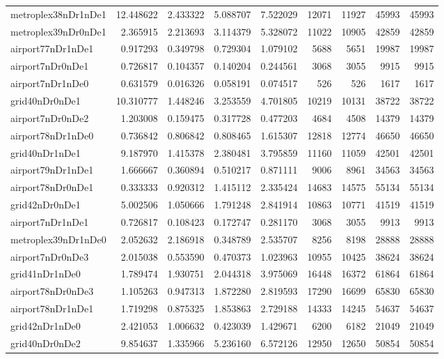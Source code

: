 \begin{longtable}{|l|r|r|r|r|r|r|r|r|}
metroplex38nDr1nDe1 & 12.448622 & 2.433322 & 5.088707 & 7.522029 & 12071 & 11927 & 45993 & 45993 \\
metroplex39nDr0nDe1 & 2.365915 & 2.213693 & 3.114379 & 5.328072 & 11022 & 10905 & 42859 & 42859 \\
airport77nDr1nDe1 & 0.917293 & 0.349798 & 0.729304 & 1.079102 & 5688 & 5651 & 19987 & 19987 \\
airport7nDr0nDe1 & 0.726817 & 0.104357 & 0.140204 & 0.244561 & 3068 & 3055 & 9915 & 9915 \\
airport7nDr1nDe0 & 0.631579 & 0.016326 & 0.058191 & 0.074517 & 526 & 526 & 1617 & 1617 \\
grid40nDr0nDe1 & 10.310777 & 1.448246 & 3.253559 & 4.701805 & 10219 & 10131 & 38722 & 38722 \\
airport7nDr0nDe2 & 1.203008 & 0.159475 & 0.317728 & 0.477203 & 4684 & 4508 & 14379 & 14379 \\
airport78nDr1nDe0 & 0.736842 & 0.806842 & 0.808465 & 1.615307 & 12818 & 12774 & 46650 & 46650 \\
grid40nDr1nDe1 & 9.187970 & 1.415378 & 2.380481 & 3.795859 & 11160 & 11059 & 42501 & 42501 \\
airport79nDr1nDe1 & 1.666667 & 0.360894 & 0.510217 & 0.871111 & 9006 & 8961 & 34563 & 34563 \\
airport78nDr0nDe1 & 0.333333 & 0.920312 & 1.415112 & 2.335424 & 14683 & 14575 & 55134 & 55134 \\
grid42nDr0nDe1 & 5.002506 & 1.050666 & 1.791248 & 2.841914 & 10863 & 10771 & 41519 & 41519 \\
airport7nDr1nDe1 & 0.726817 & 0.108423 & 0.172747 & 0.281170 & 3068 & 3055 & 9913 & 9913 \\
metroplex39nDr1nDe0 & 2.052632 & 2.186918 & 0.348789 & 2.535707 & 8256 & 8198 & 28888 & 28888 \\
airport7nDr0nDe3 & 2.015038 & 0.553590 & 0.470373 & 1.023963 & 10955 & 10425 & 38624 & 38624 \\
grid41nDr1nDe0 & 1.789474 & 1.930751 & 2.044318 & 3.975069 & 16448 & 16372 & 61864 & 61864 \\
airport78nDr0nDe3 & 1.105263 & 0.947313 & 1.872280 & 2.819593 & 17290 & 16699 & 65830 & 65830 \\
airport78nDr1nDe1 & 1.719298 & 0.875325 & 1.853863 & 2.729188 & 14333 & 14245 & 54637 & 54637 \\
grid42nDr1nDe0 & 2.421053 & 1.006632 & 0.423039 & 1.429671 & 6200 & 6182 & 21049 & 21049 \\
grid40nDr0nDe2 & 9.854637 & 1.335966 & 5.236160 & 6.572126 & 12950 & 12650 & 50854 & 50854 \\

\end{longtable}
